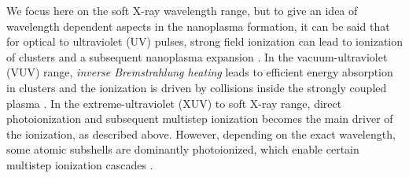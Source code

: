 We focus here on the soft X-ray wavelength range, but to give an idea of wavelength dependent aspects in the nanoplasma formation, it can be said that for optical to ultraviolet (UV) pulses, strong field ionization can lead to ionization of clusters and a subsequent nanoplasma expansion \citep{Springate-2000-PRA}. In the vacuum-ultraviolet (VUV) range, \textit{inverse Bremstrahlung heating} leads to efficient energy absorption in clusters and the ionization is driven by collisions inside the strongly coupled plasma \citep{Wabnitz-2002-Nature}. In the extreme-ultraviolet (XUV) to soft X-ray range, direct photoionization and subsequent multistep ionization becomes the main driver of the ionization, as described above. However, depending on the exact wavelength, some atomic subshells are dominantly photoionized, which enable certain multistep ionization cascades \citep{Arbeiter-2011-NJP}.\\[1\baselineskip]
%
%
%
